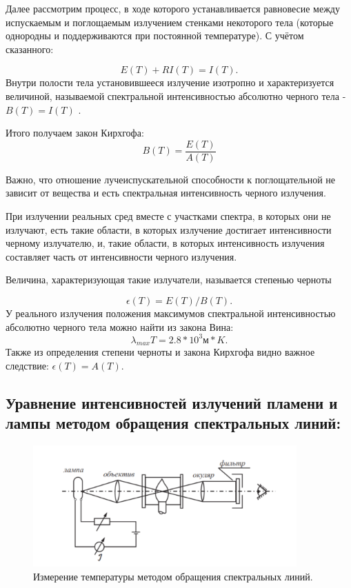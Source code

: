 \documentclass[a4paper]{article}
\begin{document}
Далее рассмотрим процесс, в ходе которого устанавливается равновесие между испускаемым и поглощаемым излучением стенками некоторого тела (которые однородны и поддерживаются при постоянной температуре). С учётом сказанного:\par
$$E(T)+R I(T)=I(T) .$$
Внутри полости тела установившееся излучение изотропно и характеризуется величиной, называемой спектральной интенсивностью абсолютно черного тела - $B(T)=I(T)$ . \par
Итого получаем закон Кирхгофа:
$$B(T)= \frac{E(T)}{A(T)}$$
\par
Важно, что отношение лучеиспускательной способности к поглощательной не зависит от вещества и есть спектральная интенсивность черного излучения. \par
При излучении реальных сред вместе с участками спектра, в которых они не излучают, есть такие области, в которых излучение достигает интенсивности черному излучателю, и, такие области, в которых интенсивность излучения составляет часть от интенсивности черного излучения. \par
Величина, характеризующая такие излучатели, называется степенью черноты \par
$$\epsilon (T)=E(T)/B(T).$$
У реального излучения положения максимумов спектральной интенсивностью абсолютно черного тела можно найти из закона Вина:
$$\lambda_{max} T=2.8 * 10^3м*K.$$
Также из определения степени черноты и закона Кирхгофа
видно важное следствие: $\epsilon(T)=A(T)$.



\subsection*{Уравнение интенсивностей излучений пламени и лампы методом обращения спектральных линий:}

\begin {figure}[H]
\begin{center}
\par
\includegraphics[width=0.9\textwidth]{pl1.png}
\caption{Измерение температуры методом обращения спектральных линий.}
\end{center}
\end {figure}
\end{document}
